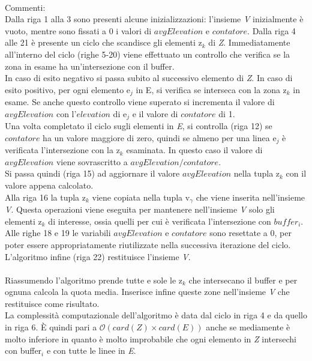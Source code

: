 \mbox{}\\
Commenti:\\
Dalla riga 1 alla 3 sono presenti alcune inizializzazioni: l'insieme \textit{V} inizialmente è vuoto, mentre sono fissati a $0$ i valori di $avgElevation$ e $contatore$. Dalla riga 4 alle 21 è presente un ciclo che scandisce gli elementi z$_k$ di \textit{Z}. Immediatamente all'interno del ciclo (righe 5-20) viene effettuato un controllo che verifica se la zona in esame ha un'intersezione con il buffer.\\ 
In caso di esito negativo si passa subito al successivo elemento di \textit{Z}. In caso di esito positivo, per ogni elemento e$_j$ in E, si verifica se interseca con la zona z$_k$ in esame. Se anche questo controllo viene superato si incrementa il valore di $avgElevation$ con l'$elevation$ di e$_j$ e il valore di $contatore$ di 1.\\
Una volta completato il ciclo sugli elementi in \textit{E}, si controlla (riga 12) se $contatore$ ha un valore maggiore di zero, quindi se almeno per una linea e$_j$ è verificata l'intersezione con la z$_k$ esaminata. In questo caso il valore di $avgElevation$ viene sovrascritto a $avgElevation/contatore$.\\
Si passa quindi (riga 15) ad aggiornare il valore $avgElevation$ nella tupla z$_k$ con il valore appena calcolato.\\
Alla riga 16 la tupla z$_k$ viene copiata nella tupla v$_\gamma$ che viene inserita nell'insieme \textit{V}. Questa operazioni viene eseguita per mantenere nell'insieme \textit{V} solo gli elementi z$_k$ di interesse, ossia quelli per cui è verificata l'intersezione con $buffer_i$.\\  
Alle righe 18 e 19 le variabili $avgElevation$ e $contatore$ sono resettate a $0$, per poter essere appropriatamente riutilizzate nella successiva iterazione del ciclo.\\
L'algoritmo infine (riga 22) restituisce l'insieme \textit{V}.\\
\mbox{}\\
Riassumendo l'algoritmo prende tutte e sole le z$_k$ che intersecano il buffer e per ognuna calcola la quota media. Inserisce infine queste zone nell'insieme \textit{V} che restituisce come risultato.\\
La complessità computazionale dell'algoritmo è data dal ciclo in riga 4 e da quello in riga 6. È quindi pari a $\mathcal{O}(card(\textit{Z}) \times card(\textit{E}))$ anche se mediamente è molto inferiore in quanto è molto improbabile che ogni elemento in \textit{Z} intersechi con buffer$_i$ e con tutte le linee in \textit{E}. 
